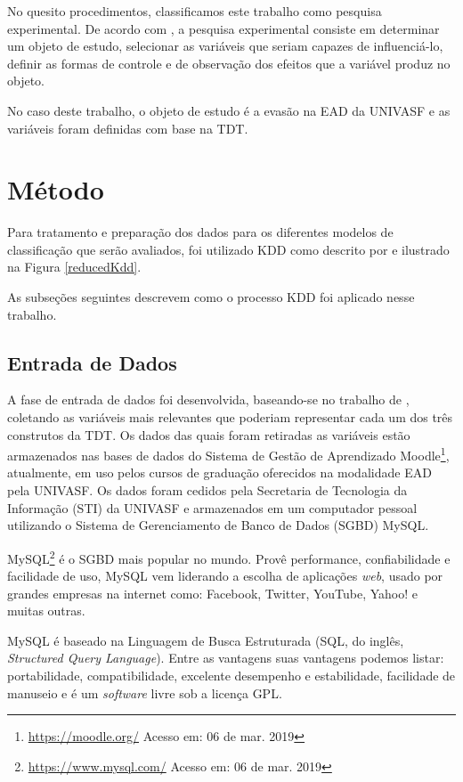 No quesito procedimentos, classificamos este trabalho como pesquisa
experimental. De acordo com , a pesquisa
experimental consiste em determinar um objeto de estudo, selecionar as variáveis
que seriam capazes de influenciá-lo, definir as formas de controle e de
observação dos efeitos que a variável produz no objeto.

No caso deste trabalho, o objeto de estudo é a evasão na EAD da UNIVASF e as
variáveis foram definidas com base na TDT.

\section{Método}

Para tratamento e preparação dos dados para os diferentes modelos de
classificação que serão avaliados, foi utilizado KDD como descrito por
 e ilustrado na Figura \ref{reducedKdd}.


As subseções seguintes descrevem como o processo KDD foi aplicado nesse
trabalho.

\subsection{Entrada de Dados}

A fase de entrada de dados foi desenvolvida, baseando-se no trabalho de
, coletando as variáveis mais relevantes que
poderiam representar cada um dos três construtos da TDT. Os dados das quais
foram retiradas as variáveis estão armazenados nas bases de dados do Sistema de
Gestão de Aprendizado Moodle\footnote{\url{https://moodle.org/} Acesso em: 06 de
mar. 2019}, atualmente, em uso pelos cursos de graduação oferecidos na
modalidade EAD pela UNIVASF. Os dados foram cedidos pela Secretaria de
Tecnologia da Informação (STI) da UNIVASF e armazenados em um computador pessoal
utilizando o Sistema de Gerenciamento de Banco de Dados (SGBD) MySQL.

MySQL\footnote{\url{https://www.mysql.com/} Acesso em: 06 de mar. 2019} é o SGBD
mais popular no mundo. Provê performance, confiabilidade e facilidade de uso,
MySQL vem liderando a escolha de aplicações \textit{web}, usado por grandes
empresas na internet como: Facebook, Twitter, YouTube, Yahoo! e muitas outras.

MySQL é baseado na Linguagem de Busca Estruturada (SQL, do inglês,
\textit{Structured Query Language}). Entre as vantagens suas vantagens podemos
listar: portabilidade, compatibilidade, excelente desempenho e estabilidade,
facilidade de manuseio e é um \textit{software} livre sob a licença GPL.

